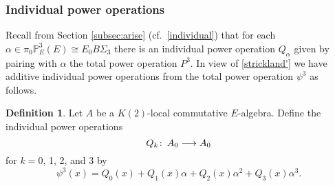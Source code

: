 \documentclass{gtpart}
\theoremstyle{definition}
\newtheorem{defn}[thm]{Definition}
\theoremstyle{remark}
\def\co{\colon\thinspace}
\newcommand{\mb}[1]{\mathbb{#1}}
\newcommand{\BP}{{\mb P}}
\newcommand{\A}{\alpha}
\newcommand{\p}{\psi^3}
\numberwithin{equation}{section}
\numberwithin{thm}{section}
\begin{document}
\subsubsection*{Individual power operations}

Recall from Section \ref{subsec:arise} (cf.~\eqref{individual}) that for 
each $\A \in \pi_0 \BP_E^3(E) \cong E_0 B\Sigma_3$ there is an 
individual power operation $Q_\A$ given by pairing with $\A$ the total 
power operation $P^3$.  In view of \eqref{strickland'} we have additive 
individual power operations from the total power operation $\p$ as 
follows.  

\begin{defn}
\label{def:Q}
 Let $A$ be a $K(2)$-local commutative $E$-algebra.  Define the 
 individual power operations 
 \[
  Q_k \co A_0 \longrightarrow A_0 
 \]
 for $k = 0$, 1, 2, and 3 by 
 \[
  \p (x) = Q_0(x) + Q_1(x) \A + Q_2(x) \A^2 + Q_3(x) \A^3.  
 \]
\end{defn}
\end{document}
